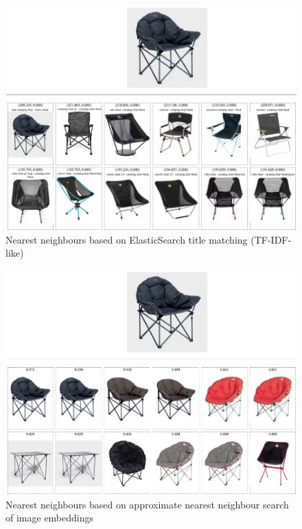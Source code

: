 \begin{figure}
  \includegraphics[width=\linewidth]{figures/compare/chair_es}
  \caption{Nearest neighbours based on ElasticSearch title matching (TF-IDF-like)}
  \label{chair_es}
\end{figure}
\begin{figure}
  \includegraphics[width=\linewidth]{figures/compare/chair_nmslib}
  \caption{Nearest neighbours based on approximate nearest neighbour search of image embeddings}
  \label{chair_nmslib}
\end{figure}
